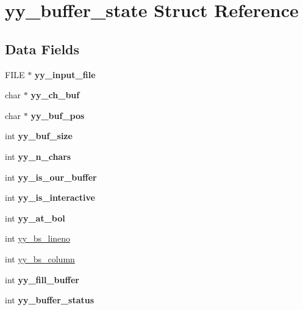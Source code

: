 \hypertarget{structyy__buffer__state}{}\section{yy\+\_\+buffer\+\_\+state Struct Reference}
\label{structyy__buffer__state}
\subsection*{Data Fields}
\begin{DoxyCompactItemize}
\item 
\mbox{\label{structyy__buffer__state_aae49f75f50cbf473db7ba7a6134b9a6a}} 
F\+I\+LE $\ast$ {\bfseries yy\+\_\+input\+\_\+file}
\item 
\mbox{\label{structyy__buffer__state_ab8c1fb056870dfcc59768bca4e988cdd}} 
char $\ast$ {\bfseries yy\+\_\+ch\+\_\+buf}
\item 
\mbox{\label{structyy__buffer__state_afd1af9e284d7c432400835e417d85ee8}} 
char $\ast$ {\bfseries yy\+\_\+buf\+\_\+pos}
\item 
\mbox{\label{structyy__buffer__state_ae404f23e6786820b0213464ffcf9fd03}} 
int {\bfseries yy\+\_\+buf\+\_\+size}
\item 
\mbox{\label{structyy__buffer__state_aa86c122f2050dbfd365fcf547e6fc1c3}} 
int {\bfseries yy\+\_\+n\+\_\+chars}
\item 
\mbox{\label{structyy__buffer__state_a1e64bbdc1343d886bee3af97e19644bc}} 
int {\bfseries yy\+\_\+is\+\_\+our\+\_\+buffer}
\item 
\mbox{\label{structyy__buffer__state_a2a823a361fbbe1af51a957d0d0cbf4e2}} 
int {\bfseries yy\+\_\+is\+\_\+interactive}
\item 
\mbox{\label{structyy__buffer__state_a8e60af6806593faf52d1cc01148af6e3}} 
int {\bfseries yy\+\_\+at\+\_\+bol}
\item 
int \hyperlink{structyy__buffer__state_a59c414c619ca0071fe3a091336106d82}{yy\+\_\+bs\+\_\+lineno}
\item 
int \hyperlink{structyy__buffer__state_ad9867983bbc1666304d83623cd6e3dd8}{yy\+\_\+bs\+\_\+column}
\item 
\mbox{\label{structyy__buffer__state_a5e492694db97a0d7760d8cc5fd058dfd}} 
int {\bfseries yy\+\_\+fill\+\_\+buffer}
\item 
\mbox{\label{structyy__buffer__state_a6ca09e676a787676260c558a0f731285}} 
int {\bfseries yy\+\_\+buffer\+\_\+status}
\end{DoxyCompactItemize}


